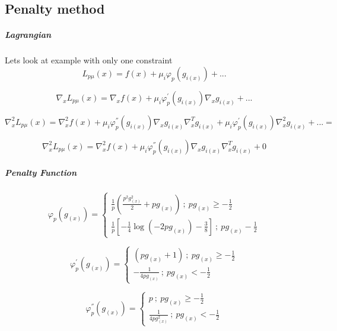\documentclass[12pt]{article}
\begin{document}
\subsection{Penalty method}
\subparagraph{Lagrangian} Lets look at example with only one constraint
\[L_{p\mu}(x) = f(x) + \mu_i \varphi_{p }(g_{i(x)}) + ... \]

\[\nabla_x L_{p\mu}(x) = \nabla_x f(x) + \mu_i \varphi_{p }^{'} (g_{i(x)}) \nabla_x g_{i(x)} + ... \]

\[\nabla_x^2 L_{p\mu}(x) = \nabla_x^2 f(x) +  \mu_i \varphi_{p}^{''} (g_{i(x)}) \nabla_x g_{i(x)}\nabla_x^T g_{i(x)} +  \mu_i \varphi_{p}^{'} (g_{i(x)}) \nabla_x^2 g_{i(x)} + ... = \]

\[\nabla_x^2 L_{p\mu}(x) = \nabla_x^2 f(x) +  \mu_i \varphi_{p}^{''} (g_{i(x)}) \nabla_x g_{i(x)}\nabla_x^T g_{i(x)} + 0 \]

\subparagraph{Penalty Function}
\[
    \varphi_{p}(g_{(x)}) =\left\{
                \begin{array}{ll}
                  \frac{1}{p}(\frac{p^2 g_{(x)}^2}{2} + pg_{(x)}) \ ; \ pg_{(x)} \geq -\frac{1}{2} \\
                  \frac{1}{p} [-\frac{1}{4} \log(-2pg_{(x)})-\frac{3}{8}] \ ; \ pg_{(x)} -\frac{1}{2}
                \end{array}
              \right.
\]

\[
    \varphi_{p}^{'}(g_{(x)}) =\left\{
                \begin{array}{ll}
                  (pg_{(x)}+1) \ ; \ pg_{(x)} \geq -\frac{1}{2} \\
				-\frac{1}{4pg_{(x)}}\ ; \ pg_{(x)} < -\frac{1}{2}
                \end{array}
              \right.
\]

\[
    \varphi_{p}^{''}(g_{(x)}) =\left\{
                \begin{array}{ll}
                   p \ ; \ pg_{(x)} \geq -\frac{1}{2} \\
				\frac{1}{4pg_{(x)}^2}\ ; \ pg_{(x)} < -\frac{1}{2}
                \end{array}
              \right.
\]
\end{document}
